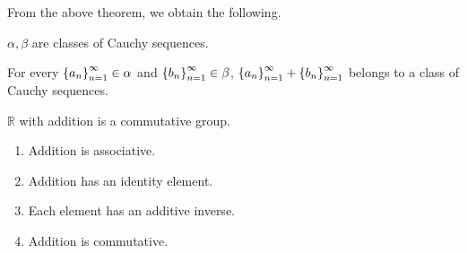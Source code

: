 From the above theorem, we obtain the following.

\begin{corollary}
    $\alpha, \beta$ are classes of Cauchy sequences.

    For every ${\left\{{a_{n}}\right\}}^{\infty}_{n=1}\in\alpha$ and ${\left\{{b_{n}}\right\}}^{\infty}_{n=1}\in\beta$, ${\left\{{a_{n}}\right\}}^{\infty}_{n=1} + {\left\{{b_{n}}\right\}}^{\infty}_{n=1}$ belongs to a class of Cauchy sequences.
\end{corollary}

\begin{theorem}
    $\mathbb{R}$ with addition is a commutative group.
    \begin{enumerate}[label={(F\arabic*)},itemsep=0pt,topsep=0pt]
        \item Addition is associative.
        \item Addition has an identity element.
        \item Each element has an additive inverse.
        \item Addition is commutative.
    \end{enumerate}
\end{theorem}

